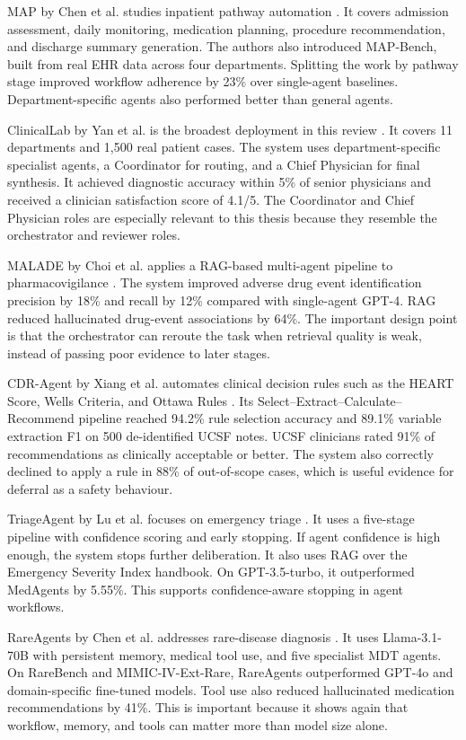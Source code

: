 MAP by Chen et al. studies inpatient pathway automation \cite{Chen2025MAP}. It
covers admission assessment, daily monitoring, medication planning, procedure
recommendation, and discharge summary generation. The authors also introduced
MAP-Bench, built from real EHR data across four departments. Splitting the work
by pathway stage improved workflow adherence by 23\% over single-agent baselines.
Department-specific agents also performed better than general agents.

ClinicalLab by Yan et al. is the broadest deployment in this review
\cite{Yan2024ClinicalLab}. It covers 11 departments and 1{,}500 real patient
cases. The system uses department-specific specialist agents, a Coordinator for
routing, and a Chief Physician for final synthesis. It achieved diagnostic
accuracy within 5\% of senior physicians and received a clinician satisfaction
score of 4.1/5. The Coordinator and Chief Physician roles are especially relevant
to this thesis because they resemble the orchestrator and reviewer roles.

MALADE by Choi et al. applies a RAG-based multi-agent pipeline to
pharmacovigilance \cite{Choi2024MALADE}. The system improved adverse drug event
identification precision by 18\% and recall by 12\% compared with single-agent
GPT-4. RAG reduced hallucinated drug-event associations by 64\%. The important
design point is that the orchestrator can reroute the task when retrieval quality
is weak, instead of passing poor evidence to later stages.

CDR-Agent by Xiang et al. automates clinical decision rules such as the HEART
Score, Wells Criteria, and Ottawa Rules \cite{Xiang2025CDRAgent}. Its
Select--Extract--Calculate--Recommend pipeline reached 94.2\% rule selection
accuracy and 89.1\% variable extraction F1 on 500 de-identified UCSF notes. UCSF
clinicians rated 91\% of recommendations as clinically acceptable or better. The
system also correctly declined to apply a rule in 88\% of out-of-scope cases,
which is useful evidence for deferral as a safety behaviour.

TriageAgent by Lu et al. focuses on emergency triage \cite{Lu2024TriageAgent}.
It uses a five-stage pipeline with confidence scoring and early stopping. If
agent confidence is high enough, the system stops further deliberation. It also
uses RAG over the Emergency Severity Index handbook. On GPT-3.5-turbo, it
outperformed MedAgents by 5.55\%. This supports confidence-aware stopping in
agent workflows.

RareAgents by Chen et al. addresses rare-disease diagnosis
\cite{Chen2024RareAgents}. It uses Llama-3.1-70B with persistent memory, medical
tool use, and five specialist MDT agents. On RareBench and MIMIC-IV-Ext-Rare,
RareAgents outperformed GPT-4o and domain-specific fine-tuned models. Tool use
also reduced hallucinated medication recommendations by 41\%. This is important
because it shows again that workflow, memory, and tools can matter more than
model size alone.

